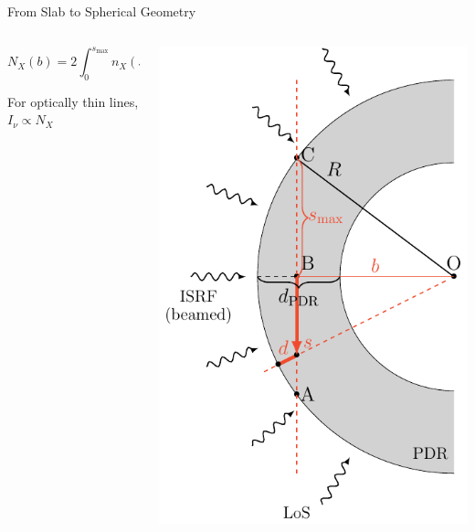\documentclass[10pt,dvipsnames,hyperref={colorlinks=false}]{beamer}
\newcommand{\dd}[1]{\mathrm{d}#1}
\begin{document}
\begin{frame}{From Slab to Spherical Geometry}
\begin{columns}[T]
\begin{column}{.6\textwidth}
{\begin{itemize}
\begin{equation*}
                    N_X(b) = 2\int_{0}^{s_{\max}} n_X(s') \dd{s'}
                \end{equation*}
            \end{itemize}
            For optically thin lines, $I_\nu \propto N_X$}
        \end{column}
        \begin{column}{.32\textwidth}
            \includegraphics[width=\textwidth,keepaspectratio]{sphere_geometry_1LoS.pdf}
        \end{column}
    \end{columns}
\end{frame}
\end{document}
